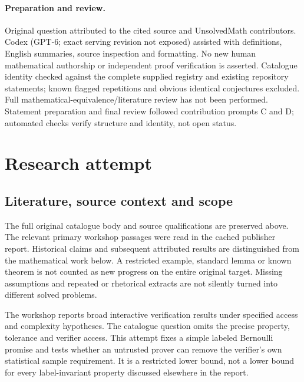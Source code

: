 \documentclass[11pt]{article}
\begin{document}
\paragraph{Preparation and review.}
Original question attributed to the cited source and UnsolvedMath contributors. Codex (GPT-6; exact serving revision not exposed) assisted with definitions, English summaries, source inspection and formatting. No new human mathematical authorship or independent proof verification is asserted. Catalogue identity checked against the complete supplied registry and existing repository statements; known flagged repetitions and obvious identical conjectures excluded. Full mathematical-equivalence/literature review has not been performed. Statement preparation and final review followed contribution prompts C and D; automated checks verify structure and identity, not open status.
\label{end:statement}

\section{Research attempt}
\subsection{Literature, source context and scope}
The full original catalogue body and source qualifications are preserved above. The relevant primary workshop passages were read in the cached publisher report. Historical claims and subsequent attributed results are distinguished from the mathematical work below. A restricted example, standard lemma or known theorem is not counted as new progress on the entire original target. Missing assumptions and repeated or rhetorical extracts are not silently turned into different solved problems.

The workshop reports broad interactive verification results under specified access and complexity hypotheses. The catalogue question omits the precise property, tolerance and verifier access. This attempt fixes a simple labeled Bernoulli promise and tests whether an untrusted prover can remove the verifier's own statistical sample requirement. It is a restricted lower bound, not a lower bound for every label-invariant property discussed elsewhere in the report.
\end{document}
